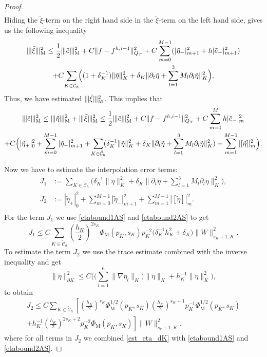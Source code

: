 \documentclass[reqno,a4paper]{amsart}
\theoremstyle{remark}
\numberwithin{equation}{section}
\newcommand{\Mnorm}[1]{|\mkern-1mu|\mkern-1mu|#1|\mkern-1mu|\mkern-1mu|_\mathrm{M}}
\def\d{\partial}
\def\et{\tilde{e}}
\def\etat{\tilde{\eta}}
\def\xit{\tilde{\xi}}
\def\sumK{\sum_{K\in\mathcal{\tilde{C}}_h}\!\!}
\begin{document}
\begin{proof}
\begin{multline*}
\end{multline*}
Hiding the $\xit$-term on the right hand side in the $\xit$-term on the left hand side,
gives us the following inequality
\begin{multline*}
\Mnorm{\xit}^2 \leq \frac{1}{2} \Mnorm{\et}^2+ C \| f-f^{h,i-1} \|^2_{Q_T}
+C\sum_{m=0}^{M-1}(|\etat_-|^2_{m+1}+h|\et_-|^2_{m+1})\\
+C\!\sumK\Big((1+\delta_K^{-1})\|\etat\|^2_K
+\delta_K\|\d_t\etat+\sum_{l=1}^3 M_l\d_l\etat\|^2_K\Big).
\end{multline*}
Thus, we have estimated $\Mnorm{\xit}^2$. This implies that
\begin{multline}\label{est_e1}
\Mnorm{\et}^2 \leq \Mnorm{\etat}^2 + \Mnorm{\xit}^2
\leq \frac{1}{2} \Mnorm{\et}^2+ C\|f-f^{h,i-1}\|^2_{Q_T} 
+ C\sum_{m=1}^M h |\et_-|^2_m\\
+C\Big(|\etat_+|^2_0+\sum_{m=0}^{M-1}|\etat_-|^2_{m+1}
+\!\sumK(\delta_K^{-1}\|\etat\|_K^2
+\delta_K\|\d_t\etat+\sum_{l=1}^3M_l\d_l\etat\|^2_K)
+\sum_{m=1}^{M-1}|[\etat]|^2_m \Big).
\end{multline}

Now we have to estimate the interpolation error terms:
\[
\begin{split}
J_1 &:= \sumK\Big(\delta_K^{-1}\|\etat\|_K^2
+\delta_K\|\d_t\etat+\sum_{l=1}^3M_l\d_l\etat\|^2_K\Big),\\
J_2 &:=|\etat_+|^2_0+\sum_{m=0}^{M-1}|\etat_-|^2_{m+1}
+\sum_{m=1}^{M-1}|[\etat]|^2_m.\\
\end{split}
\]
For the term $J_1$ we use \eqref{etabound1AS} and \eqref{etabound2AS} to get
\begin{equation}\label{estT1}
J_1\leq C\sumK\left(\frac{h_K}{2}\right)^{2s_K}\Phi_\mathrm{M}(p_K,s_K)
p_K^{-2}\big(\delta_K^{-1}h^2_K+\delta_K\big)\|W\|_{s_K+1,K}^2.
\end{equation}
To estimate the term $J_2$ we use the trace 
estimate combined with the inverse inequality and get 
\begin{equation}\label{est_eta_dK}
\|\etat\|_{\d K}^2 \leq C\Big(\big(\sum_{l=1}^6\|\nabla\etat_l\|_K\big)
\|\etat\|_K
+h_K^{-1}\|\etat\|_K^2\Big),
\end{equation}
to obtain
\begin{multline}\label{estT2}
J_2 \leq C\sumK\left[\left(\frac{h_K}{2}\right)^{s_K}
\Phi_\mathrm{M}^{1/2}(p_K,s_K)
\left(\frac{h_K}{2}\right)^{s_K+1}p_K^{-1}\Phi_\mathrm{M}^{1/2}(p_K,s_K)
\right.\\
+\left.h_K^{-1}\left(\frac{h_K}{2}\right)^{2s_K+2}
p_K^{-2}\Phi_\mathrm{M}(p_K,s_K)\right]
\|W\|_{s_k+1,K}^2,
\end{multline}
where for all terms in $J_2$ we combined \eqref{est_eta_dK}
with \eqref{etabound1AS} and \eqref{etabound2AS}.


\end{proof}
\end{document}
